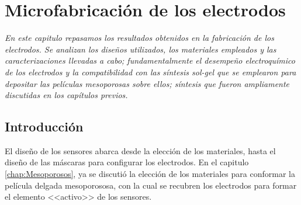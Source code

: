  \newcommand{\NoBiblioMicro}[1]{
 \ifthenelse{\equal{#1}{verdadero}}{}{}
 \NoBiblioMicro{verdadero}}

 
 \FormatoCapituloDosLineas
 
 \chapter{Microfabricación de los electrodos}\label{chap:Microfabricacion}

 \thispagestyle{empty}
	
 \noindent\textit{En este capitulo repasamos los resultados obtenidos en la fabricación de los electrodos. Se analizan los diseños utilizados, los materiales empleados y las caracterizaciones llevadas a cabo; fundamentalmente el desempeño electroquímico de los electrodos y la compatibilidad con las síntesis sol-gel que se emplearon para depositar las películas mesoporosas sobre ellos; síntesis que fueron ampliamente discutidas en los capítulos previos.
 }
 
 
 \vfill
 \minitoc
 \newpage

\section{Introducción}

	El diseño de los sensores abarca desde la elección de los materiales, hasta el diseño de las máscaras para configurar los electrodos. En el capitulo \ref{chap:Mesoporosos}, ya se discutió la elección de los materiales para conformar la película delgada mesoporososa, con la cual se recubren los electrodos para formar el elemento <<activo>> de los sensores.

